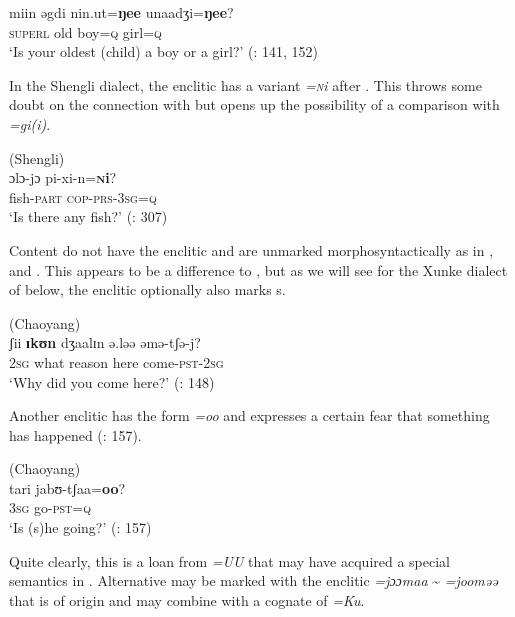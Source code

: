     \ex
    \gll miin    əgdi  nin.ut=\textbf{{ŋee}} unaadʒi=\textbf{{ŋee}}?\\
    \textsc{superl} old  boy=\textsc{q}    girl=\textsc{q}\\
    \glt ‘Is your oldest (child) a boy or a girl?’ (\citealt{Chaoke2007}: 141, 152)
    \z
    \z

In the Shengli dialect, the enclitic has a variant \textit{=\textsc{n}i} after . This throws some doubt on the connection with  but opens up the possibility of a comparison with  \textit{=gi(i)}.

\ea%
    \label{ex:tungu:18}
     (Shengli)\\
    \gll ɔlɔ-jɔ    {pi-xi-n=\textbf{\textsc{n}}\textbf{i}}?\\
    fish-\textsc{part}  \textsc{cop}-\textsc{prs}-3\textsc{sg}=\textsc{q}\\
    \glt ‘Is there any fish?’ (\citealt{HanMeng1993}: 307)
    \z

Content  do not have the enclitic and are unmarked morphosyntactically as in , and . This appears to be a difference to , but as we will see for the Xunke dialect of  below, the enclitic optionally also marks s.

\ea%
    \label{ex:tungu:19}
     (Chaoyang)\\
    \gll ʃii \textbf{{ɪkʊn}} dʒaalɪn    ə.ləə  əmə-tʃə-j?\\
    2\textsc{sg}  what  reason    here  come-\textsc{pst}-2\textsc{sg}\\
    \glt ‘Why did you come here?’ (\citealt{HuZengyi2001}: 148)
    \z

Another enclitic has the form \textit{=oo} and expresses a certain fear that something has happened (\citealt{HuZengyi2001}: 157).

\ea%
    \label{ex:tungu:20}
     (Chaoyang)\\
    \gll tari  jabʊ-tʃ{aa=}\textbf{{oo}}?\\
    3\textsc{sg}    go-\textsc{pst}=\textsc{q}\\
    \glt ‘Is (s)he going?’ (\citealt{HuZengyi2001}: 157)
    \z

\noindent Quite clearly, this is a loan from  \textit{=UU} that may have acquired a special semantics in . Alternative  may be marked with the enclitic \textit{=jɔɔmaa} {\textasciitilde} \textit{=jooməə} that is of  origin and may combine with a cognate of  \textit{=Ku}.

